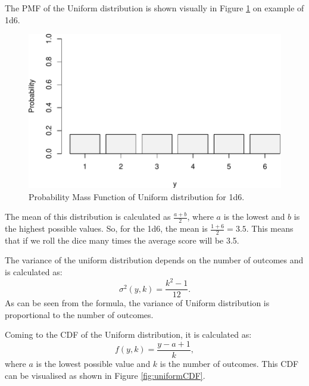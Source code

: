 \documentclass[
]{book}
\theoremstyle{definition}
\theoremstyle{definition}
\theoremstyle{definition}
\theoremstyle{definition}
\theoremstyle{remark}
\begin{document}
The PMF of the Uniform distribution is shown visually in Figure \ref{fig:uniformPMF} on example of 1d6.

\begin{figure}
\centering
\includegraphics{Svetunkov---Statistics-for-Business-Analytics_files/figure-latex/uniformPMF-1.pdf}
\caption{\label{fig:uniformPMF}Probability Mass Function of Uniform distribution for 1d6.}
\end{figure}

The mean of this distribution is calculated as \(\frac{a+b}{2}\), where \(a\) is the lowest and \(b\) is the highest possible values. So, for the 1d6, the mean is \(\frac{1+6}{2}=3.5\). This means that if we roll the dice many times the average score will be 3.5.

The variance of the uniform distribution depends on the number of outcomes and is calculated as:
\begin{equation}
    \sigma^2(y, k) = \frac{k^2-1}{12} .
    \label{eq:UniformVariance}
\end{equation}
As can be seen from the formula, the variance of Uniform distribution is proportional to the number of outcomes.

Coming to the CDF of the Uniform distribution, it is calculated as:
\begin{equation}
    f(y, k) = \frac{y-a+1}{k},
    \label{eq:UniformCDF}
\end{equation}
where \(a\) is the lowest possible value and \(k\) is the number of outcomes. This CDF can be visualised as shown in Figure \ref{fig:uniformCDF}.
\end{document}
